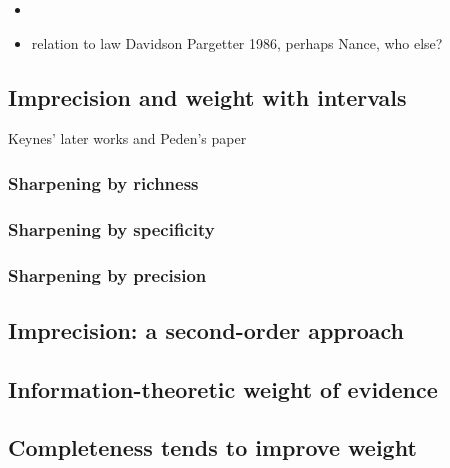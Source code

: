 \documentclass[
  10pt,
  dvipsnames,enabledeprecatedfontcommands]{scrartcl}
\providecommand{\tightlist}{%
  \setlength{\itemsep}{0pt}\setlength{\parskip}{0pt}}
\begin{document}
\begin{itemize}
\tightlist
\item
\item
  relation to law Davidson Pargetter 1986, perhaps Nance, who else?
\end{itemize}

\hypertarget{imprecision-and-weight-with-intervals}{%
\subsection{Imprecision and weight with
intervals}\label{imprecision-and-weight-with-intervals}}

Keynes' later works and Peden's paper

\hypertarget{sharpening-by-richness}{%
\subsubsection{Sharpening by richness}\label{sharpening-by-richness}}

\hypertarget{sharpening-by-specificity}{%
\subsubsection{Sharpening by
specificity}\label{sharpening-by-specificity}}

\hypertarget{sharpening-by-precision}{%
\subsubsection{Sharpening by precision}\label{sharpening-by-precision}}

\hypertarget{imprecision-a-second-order-approach}{%
\subsection{Imprecision: a second-order
approach}\label{imprecision-a-second-order-approach}}

\hypertarget{information-theoretic-weight-of-evidence}{%
\subsection{Information-theoretic weight of
evidence}\label{information-theoretic-weight-of-evidence}}

\hypertarget{completeness-tends-to-improve-weight}{%
\subsection{Completeness tends to improve
weight}\label{completeness-tends-to-improve-weight}}
\end{document}
